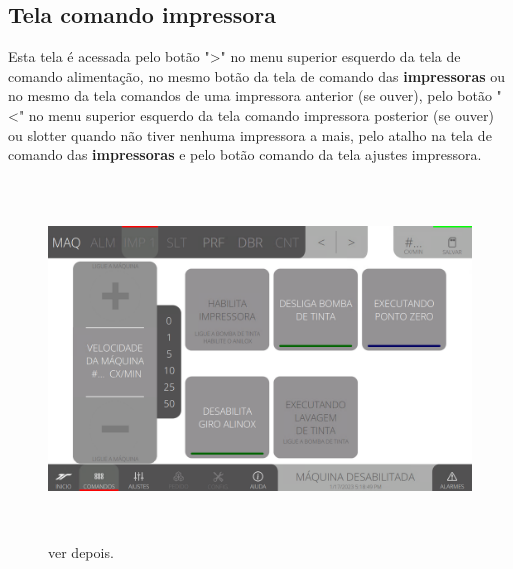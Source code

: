 \thispagestyle{fancy}
\vspace*{\fill}
\subsection{Tela comando impressora}
 Esta tela é acessada pelo botão "\textgreater" no menu superior esquerdo da tela de comando alimentação, no mesmo botão da tela de comando das
\textbf{impressoras} ou no mesmo da tela comandos de uma impressora anterior (se ouver), pelo botão "\textless{}" no menu superior esquerdo da tela comando impressora posterior (se ouver) ou slotter quando não tiver nenhuma impressora a mais, pelo atalho na tela de comando das \textbf{impressoras} e pelo botão comando da tela ajustes impressora.
\begin{figure}[h]
  \centering
  \includegraphics[width=576px,height=360px]{src/images/04-printter/02-printter/commands/e-Tela-Principal.png}
  \caption{ver depois.}
   \label{}
\end{figure}

\newpage
\thispagestyle{fancy}
\vspace*{\fill}
